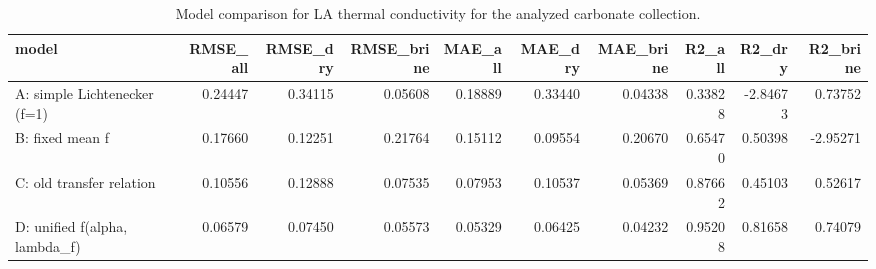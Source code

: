 \begin{table}[ht!]
\centering
\caption{Model comparison for LA thermal conductivity for the analyzed carbonate collection.}
\label{tab:la\_model\_comparison}
\begin{tabular}{lrrrrrrrrr}
\toprule
\textbf{model} & \textbf{RMSE\_all} & \textbf{RMSE\_dry} & \textbf{RMSE\_brine} & \textbf{MAE\_all} & \textbf{MAE\_dry} & \textbf{MAE\_brine} & \textbf{R2\_all} & \textbf{R2\_dry} & \textbf{R2\_brine} \\
\midrule
A: simple Lichtenecker (f=1) & 0.24447 & 0.34115 & 0.05608 & 0.18889 & 0.33440 & 0.04338 & 0.33828 & -2.84673 & 0.73752 \\
B: fixed mean f & 0.17660 & 0.12251 & 0.21764 & 0.15112 & 0.09554 & 0.20670 & 0.65470 & 0.50398 & -2.95271 \\
C: old transfer relation & 0.10556 & 0.12888 & 0.07535 & 0.07953 & 0.10537 & 0.05369 & 0.87662 & 0.45103 & 0.52617 \\
D: unified f(alpha, lambda\_f) & 0.06579 & 0.07450 & 0.05573 & 0.05329 & 0.06425 & 0.04232 & 0.95208 & 0.81658 & 0.74079 \\
\bottomrule
\end{tabular}
\end{table}

